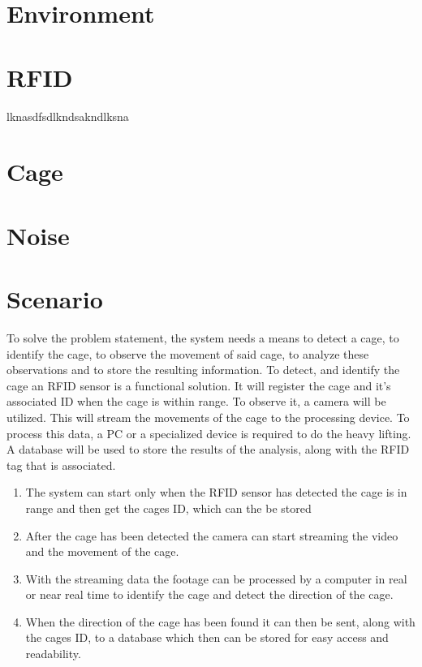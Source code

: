 \section{Environment}

\section{RFID}
lknasdfsdlkndsakndlksna

\section{Cage}

\section{Noise}

\section{Scenario}

To solve the problem statement, the system needs a means to detect a cage, to identify the cage, to observe the movement of said cage, to analyze these observations and to store the resulting information. To detect, and identify the cage an RFID sensor is a functional solution. It will register the cage and it's associated ID when the cage is within range. To observe it, a camera will be utilized. This will stream the movements of the cage to the processing device. To process this data, a PC or a specialized device is required to do the heavy lifting. A database will be used to store the results of the analysis, along with the RFID tag that is associated.

\begin{enumerate}
    \item The system can start only when the RFID sensor has detected the cage is in range and then get the cages ID, which can the be stored
    \item After the cage has been detected the camera can start streaming the video and the movement of the cage.
    \item With the streaming data the footage can be processed by a computer in real or near real time to identify the cage and detect the direction of the cage.
    \item When the direction of the cage has been found it can then be sent, along with the cages ID, to a database which then can be stored for easy access and readability.
\end{enumerate}

